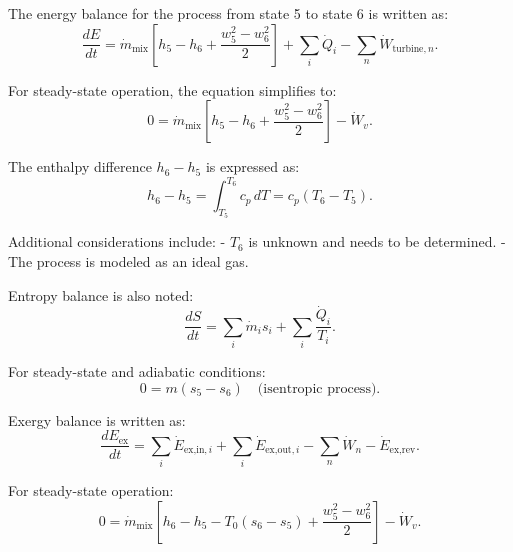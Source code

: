 The energy balance for the process from state 5 to state 6 is written as:  
\[
\frac{dE}{dt} = \dot{m}_{\text{mix}} \left[ h_5 - h_6 + \frac{w_5^2 - w_6^2}{2} \right] + \sum_i \dot{Q}_i - \sum_n \dot{W}_{\text{turbine},n}.
\]  

For steady-state operation, the equation simplifies to:  
\[
0 = \dot{m}_{\text{mix}} \left[ h_5 - h_6 + \frac{w_5^2 - w_6^2}{2} \right] - \dot{W}_v.
\]  

The enthalpy difference \( h_6 - h_5 \) is expressed as:  
\[
h_6 - h_5 = \int_{T_5}^{T_6} c_p \, dT = c_p (T_6 - T_5).
\]  

Additional considerations include:  
- \( T_6 \) is unknown and needs to be determined.  
- The process is modeled as an ideal gas.  

Entropy balance is also noted:  
\[
\frac{dS}{dt} = \sum_i \dot{m}_i s_i + \sum_i \frac{\dot{Q}_i}{T_i}.
\]  

For steady-state and adiabatic conditions:  
\[
0 = m (s_5 - s_6) \quad \text{(isentropic process)}.
\]  

Exergy balance is written as:  
\[
\frac{dE_{\text{ex}}}{dt} = \sum_i \dot{E}_{\text{ex,in},i} + \sum_i \dot{E}_{\text{ex,out},i} - \sum_n \dot{W}_{n} - \dot{E}_{\text{ex,rev}}.
\]  

For steady-state operation:  
\[
0 = \dot{m}_{\text{mix}} \left[ h_6 - h_5 - T_0 (s_6 - s_5) + \frac{w_5^2 - w_6^2}{2} \right] - \dot{W}_v.
\]